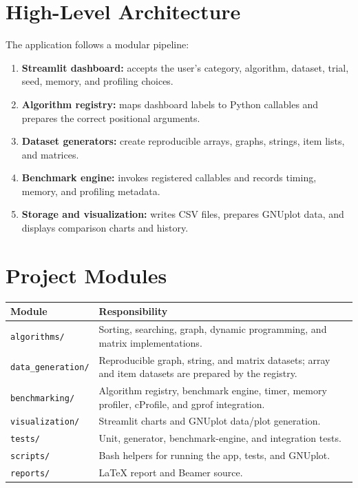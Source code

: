 \documentclass[11pt,a4paper]{report}
\begin{document}
\section{High-Level Architecture}
The application follows a modular pipeline:

\begin{enumerate}
    \item \textbf{Streamlit dashboard:} accepts the user's category, algorithm,
    dataset, trial, seed, memory, and profiling choices.
    \item \textbf{Algorithm registry:} maps dashboard labels to Python callables
    and prepares the correct positional arguments.
    \item \textbf{Dataset generators:} create reproducible arrays, graphs,
    strings, item lists, and matrices.
    \item \textbf{Benchmark engine:} invokes registered callables and records
    timing, memory, and profiling metadata.
    \item \textbf{Storage and visualization:} writes CSV files, prepares
    GNUplot data, and displays comparison charts and history.
\end{enumerate}

\section{Project Modules}
\begin{longtable}{p{}p{}}
\toprule
\textbf{Module} & \textbf{Responsibility}\\
\midrule
\texttt{algorithms/} & Sorting, searching, graph, dynamic programming, and matrix implementations.\\
\texttt{data\_generation/} & Reproducible graph, string, and matrix datasets; array and item datasets are prepared by the registry.\\
\texttt{benchmarking/} & Algorithm registry, benchmark engine, timer, memory profiler, cProfile, and gprof integration.\\
\texttt{visualization/} & Streamlit charts and GNUplot data/plot generation.\\
\texttt{tests/} & Unit, generator, benchmark-engine, and integration tests.\\
\texttt{scripts/} & Bash helpers for running the app, tests, and GNUplot.\\
\texttt{reports/} & LaTeX report and Beamer source.\\
\bottomrule
\end{longtable}
\end{document}
